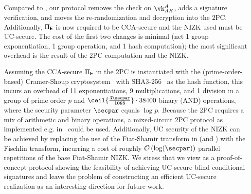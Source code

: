 \subsection{\aaluc}

Compared to \aalplus, our \aaluc protocol removes the check on $\vk_\ah^A$, adds a signature verification, and moves the re-randomization and decryption into the 2PC. Additionally, $\Pi_{\mathsf{E}}$ is now required to be CCA-secure and the NIZK used must be UC-secure. The cost of the first two changes is minimal (net 1 group exponentiation, 1 group operation, and 1 hash computation); the most significant overhead is the result of the 2PC computation and the NIZK.

Assuming the CCA-secure $\Pi_{\mathsf{E}}$ in the 2PC is instantiated with the (prime-order-based) Cramer-Shoup cryptosystem~\cite{C:CraSho98} with SHA3-256~\cite{sha3} as the hash function, this incurs an overhead of 11 exponentiations, 9 multiplications,
and 1 division in a group of prime order $p$ and $\ceil{\frac{3\secpar}{1088}}\cdot38400$ binary ({\sf AND}) operations, where the security parameter $\secpar$ equals $\log p$. Because the 2PC requires a mix of arithmetic and binary operations, a mixed-circuit 2PC protocol as implemented e.g. in~\cite{CCS:Keller20} could be used. Additionally, UC security of the NIZK can be achieved by replacing the use of the Fiat-Shamir transform in \aal (and \aalplus) with the Fischlin transform, incurring a cost of roughly $\bigO{\log(\secpar)}$ parallel repetitions of the base Fiat-Shamir NIZK. We stress that we view \aaluc as a proof-of-concept protocol showing the feasibility of achieving UC-secure blind conditional signatures and leave the problem of constructing an efficient UC-secure realization as an interesting direction for future work.